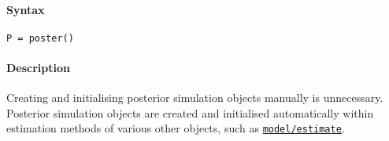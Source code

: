 


	\paragraph{Syntax}

\begin{verbatim}
P = poster()
\end{verbatim}

\paragraph{Description}

Creating and initialising posterior simulation objects manually is
unnecessary. Posterior simulation objects are created and initialised
automatically within estimation methods of various other objects, such
as \href{model/estimate}{\texttt{model/estimate}}.


